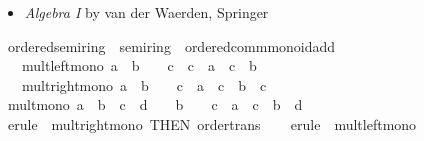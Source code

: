 \begin{isabellebody}
\begin{isamarkuptext}
\begin{itemize}
\item \emph{Algebra I} by van der Waerden, Springer%
\end{itemize}%
\end{isamarkuptext}\isamarkuptrue%
\isamarkupfalse%
\ ordered{\isacharunderscore}{\kern0pt}semiring\ {\isacharequal}{\kern0pt}\ semiring\ {\isacharplus}{\kern0pt}\ ordered{\isacharunderscore}{\kern0pt}comm{\isacharunderscore}{\kern0pt}monoid{\isacharunderscore}{\kern0pt}add\ {\isacharplus}{\kern0pt}\isanewline
\ \ \ mult{\isacharunderscore}{\kern0pt}left{\isacharunderscore}{\kern0pt}mono{\isacharcolon}{\kern0pt}\ {\isachardoublequoteopen}a\ {\isasymle}\ b\ {\isasymLongrightarrow}\ {}\ {\isasymle}\ c\ {\isasymLongrightarrow}\ c\ {\isacharasterisk}{\kern0pt}\ a\ {\isasymle}\ c\ {\isacharasterisk}{\kern0pt}\ b{\isachardoublequoteclose}\isanewline
\ \ \ mult{\isacharunderscore}{\kern0pt}right{\isacharunderscore}{\kern0pt}mono{\isacharcolon}{\kern0pt}\ {\isachardoublequoteopen}a\ {\isasymle}\ b\ {\isasymLongrightarrow}\ {}\ {\isasymle}\ c\ {\isasymLongrightarrow}\ a\ {\isacharasterisk}{\kern0pt}\ c\ {\isasymle}\ b\ {\isacharasterisk}{\kern0pt}\ c{\isachardoublequoteclose}\isanewline
{}\isanewline
\isanewline
{}\isamarkupfalse%
\ mult{\isacharunderscore}{\kern0pt}mono{\isacharcolon}{\kern0pt}\ {\isachardoublequoteopen}a\ {\isasymle}\ b\ {\isasymLongrightarrow}\ c\ {\isasymle}\ d\ {\isasymLongrightarrow}\ {}\ {\isasymle}\ b\ {\isasymLongrightarrow}\ {}\ {\isasymle}\ c\ {\isasymLongrightarrow}\ a\ {\isacharasterisk}{\kern0pt}\ c\ {\isasymle}\ b\ {\isacharasterisk}{\kern0pt}\ d{\isachardoublequoteclose}\isanewline
%
\isadelimproof
\ \ %
\endisadelimproof
%
\isatagproof
{}\isamarkupfalse%
\ {\isacharparenleft}{\kern0pt}erule\ {\isacharparenleft}{\kern0pt}{}{\isacharparenright}{\kern0pt}\ mult{\isacharunderscore}{\kern0pt}right{\isacharunderscore}{\kern0pt}mono\ {\isacharbrackleft}{\kern0pt}THEN\ order{\isacharunderscore}{\kern0pt}trans{\isacharbrackright}{\kern0pt}{\isacharparenright}{\kern0pt}\isanewline
\ \ \isamarkupfalse%
\ {\isacharparenleft}{\kern0pt}erule\ {\isacharparenleft}{\kern0pt}{}{\isacharparenright}{\kern0pt}\ mult{\isacharunderscore}{\kern0pt}left{\isacharunderscore}{\kern0pt}mono{\isacharparenright}{\kern0pt}\isanewline
\ \ \isamarkupfalse%
%
\endisatagproof
{\isafoldproof}%
%
\isadelimproof
\isanewline
%
\endisadelimproof
\isanewline
{}\isamarkupfalse%

\end{isabellebody}
